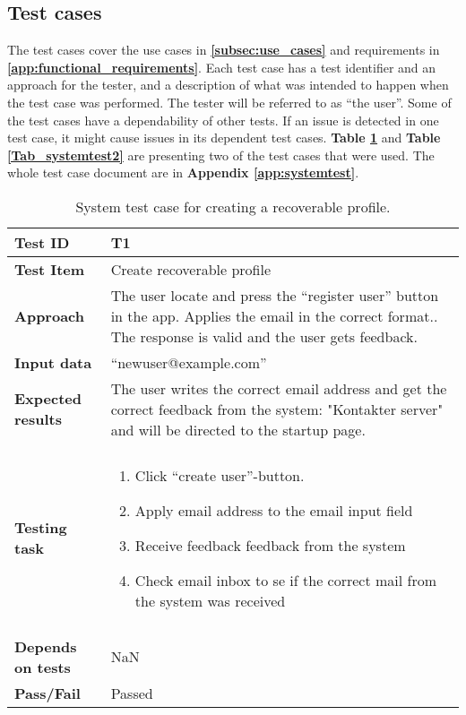 \subsection{Test cases}
The test cases cover the use cases in \textbf{\ref{subsec:use_cases}} and requirements in \textbf{\ref{app:functional_requirements}}. 
Each test case has a test identifier and an approach for the tester, and a description of what was intended to happen when the test case was performed. The tester will be referred to as “the user”. 
Some of the test cases have a dependability of other tests. If an issue is detected in one test case, it might cause issues in its dependent test cases. \textbf{Table \ref{Tab:systemtest1}} and \textbf{Table \ref{Tab_systemtest2}} are presenting two of the test cases that were used. The whole test case document are in \textbf{Appendix \ref{app:systemtest}}. 

\begin{table}[H]
	\centering
	\caption{System test case for creating a recoverable profile.}
	\begin{tabular}[b]{ | l | l  |}
		\hline
		\textbf{Test ID} & T1  \\ \hline
		\textbf{Test Item} & Create recoverable profile \\ \hline
		\textbf{Approach} & \begin{minipage}{5in}The user locate and press the “register user” button in the app. Applies the email in the correct format.. The response is valid and the user gets feedback. \end{minipage}\\ \hline
		\textbf{Input data} &  “newuser@example.com”\\ \hline
		
		\textbf{Expected results} & \begin{minipage}{5in}The user writes the correct email address and get the correct feedback from the system: "Kontakter server" and will be directed to the startup page.\end{minipage}\\ \hline&\\[-3.8ex]
		
		\textbf{Testing task} & \begin{minipage}{5in}
			\begin{enumerate}[noitemsep]
				\item Click  “create user”-button.
				\item Apply email address to the email input field 
				\item Receive feedback feedback from the system
				\item Check email inbox to se if the correct mail from the system was received 
			\end{enumerate} \end{minipage}
			\\&\\[-3.8ex] \hline
			\textbf{Depends on tests}& NaN \\ \hline	
			\textbf{Pass/Fail} & Passed \\\hline				
		\end{tabular}
		\label{Tab:systemtest1}
	\end{table}
	
